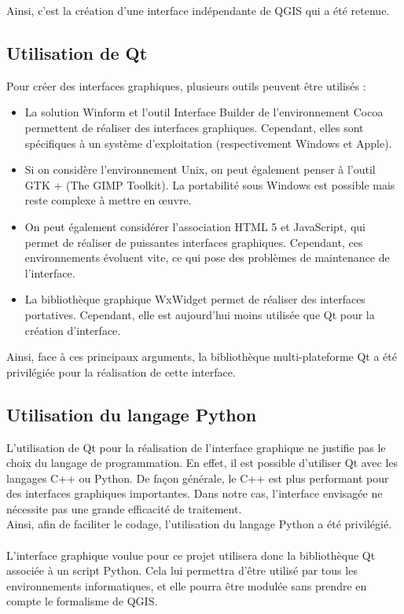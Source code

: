 Ainsi, c’est la création d’une interface indépendante de QGIS qui a été retenue.

\subsection{Utilisation de Qt}

\noindent Pour créer des interfaces graphiques, plusieurs outils peuvent être utilisés :
\begin{itemize}[label=$\rightarrow$]
	\item La solution Winform et l’outil Interface Builder de l’environnement Cocoa permettent de réaliser des interfaces graphiques.  Cependant, elles sont spécifiques à un système d’exploitation (respectivement Windows et Apple).  
	\item Si on considère l’environnement Unix, on peut également penser à l’outil GTK + (The GIMP Toolkit). La portabilité sous Windows est possible mais reste complexe à mettre en œuvre.
	\item On peut également considérer l’association HTML 5 et JavaScript, qui permet de réaliser de puissantes interfaces graphiques. Cependant, ces environnements évoluent vite, ce qui pose des problèmes de maintenance de l’interface.
	\item La bibliothèque graphique WxWidget permet de réaliser des interfaces portatives. Cependant, elle est aujourd’hui moins utilisée que Qt pour la création d’interface.
\end{itemize}

Ainsi, face à ces principaux arguments, la bibliothèque multi-plateforme Qt a été privilégiée pour la réalisation de cette interface.

\subsection{Utilisation du langage Python}

L'utilisation de Qt pour la réalisation de l'interface graphique ne justifie pas le choix du langage de programmation. En effet, il est possible d'utiliser Qt avec les langages C++ ou Python. De façon générale, le C++ est plus performant pour des interfaces graphiques importantes. Dans notre cas, l'interface envisagée ne nécessite pas une grande efficacité de traitement. \\

Ainsi, afin de faciliter le codage, l'utilisation du langage Python a été privilégié.\\\\

L'interface graphique voulue pour ce projet utilisera donc la bibliothèque Qt associée à un script Python. Cela lui permettra d'être utilisé par tous les environnements informatiques, et elle pourra être modulée sans prendre en compte le formalisme de QGIS. 


	
